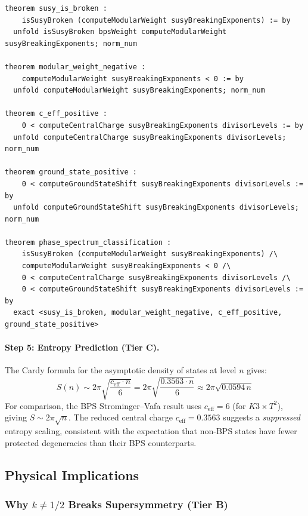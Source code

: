 \documentclass[11pt,a4paper]{article}
\theoremstyle{plain}
\theoremstyle{definition}
\theoremstyle{remark}
\newcommand{\tierB}{\textbf{Tier B}}
\newcommand{\tierC}{\textbf{Tier C}}
\begin{document}
\begin{lstlisting}[caption={Phase spectrum proof (VERIFIED, 0 sorry, dynamic List Rat architecture).}]
theorem susy_is_broken :
    isSusyBroken (computeModularWeight susyBreakingExponents) := by
  unfold isSusyBroken bpsWeight computeModularWeight susyBreakingExponents; norm_num

theorem modular_weight_negative :
    computeModularWeight susyBreakingExponents < 0 := by
  unfold computeModularWeight susyBreakingExponents; norm_num

theorem c_eff_positive :
    0 < computeCentralCharge susyBreakingExponents divisorLevels := by
  unfold computeCentralCharge susyBreakingExponents divisorLevels; norm_num

theorem ground_state_positive :
    0 < computeGroundStateShift susyBreakingExponents divisorLevels := by
  unfold computeGroundStateShift susyBreakingExponents divisorLevels; norm_num

theorem phase_spectrum_classification :
    isSusyBroken (computeModularWeight susyBreakingExponents) /\
    computeModularWeight susyBreakingExponents < 0 /\
    0 < computeCentralCharge susyBreakingExponents divisorLevels /\
    0 < computeGroundStateShift susyBreakingExponents divisorLevels := by
  exact <susy_is_broken, modular_weight_negative, c_eff_positive, ground_state_positive>
\end{lstlisting}

\paragraph{Step 5: Entropy Prediction (\tierC{}).}
The Cardy formula for the asymptotic density of states at level $n$ gives:
\[
  S(n) \sim 2\pi \sqrt{\frac{c_{\mathrm{eff}} \cdot n}{6}}
  = 2\pi \sqrt{\frac{0.3563 \cdot n}{6}}
  \approx 2\pi \sqrt{0.0594 \, n}
\]
For comparison, the BPS Strominger--Vafa result uses $c_{\mathrm{eff}} = 6$
(for $K3 \times T^2$), giving $S \sim 2\pi\sqrt{n}$. The reduced central
charge $c_{\mathrm{eff}} = 0.3563$ suggests a \emph{suppressed} entropy
scaling, consistent with the expectation that non-BPS states have fewer
protected degeneracies than their BPS counterparts.

\subsection{Physical Implications}\label{sec:physics}

\subsubsection{Why $k \neq 1/2$ Breaks Supersymmetry (\tierB{})}
\end{document}
